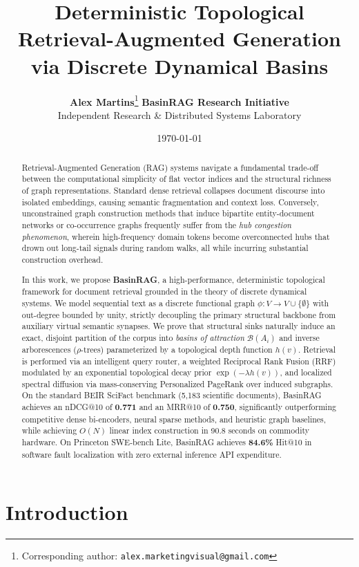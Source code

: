 \documentclass[10pt,twocolumn]{article}
\title{\textbf{Deterministic Topological Retrieval-Augmented Generation via Discrete Dynamical Basins}}
\author{
    \textbf{Alex Martins}\thanks{Corresponding author: \texttt{alex.marketingvisual@gmail.com}} \quad \textbf{BasinRAG Research Initiative} \\
    \small Independent Research \& Distributed Systems Laboratory
}
\date{\today}
\theoremstyle{definition}
\begin{document}
\maketitle

\begin{abstract}
Retrieval-Augmented Generation (RAG) systems navigate a fundamental trade-off between the computational simplicity of flat vector indices and the structural richness of graph representations. Standard dense retrieval collapses document discourse into isolated embeddings, causing semantic fragmentation and context loss. Conversely, unconstrained graph construction methods that induce bipartite entity-document networks or co-occurrence graphs frequently suffer from the \textit{hub congestion phenomenon}, wherein high-frequency domain tokens become overconnected hubs that drown out long-tail signals during random walks, all while incurring substantial construction overhead.

In this work, we propose \textbf{BasinRAG}, a high-performance, deterministic topological framework for document retrieval grounded in the theory of discrete dynamical systems. We model sequential text as a discrete functional graph $\phi: V \to V \cup \{\emptyset\}$ with out-degree bounded by unity, strictly decoupling the primary structural backbone from auxiliary virtual semantic synapses. We prove that structural sinks naturally induce an exact, disjoint partition of the corpus into \textit{basins of attraction} $\mathcal{B}(A_i)$ and inverse arborescences ($\rho$-trees) parameterized by a topological depth function $h(v)$. Retrieval is performed via an intelligent query router, a weighted Reciprocal Rank Fusion (RRF) modulated by an exponential topological decay prior $\exp(-\lambda h(v))$, and localized spectral diffusion via mass-conserving Personalized PageRank over induced subgraphs. On the standard BEIR SciFact benchmark (5,183 scientific documents), BasinRAG achieves an nDCG@10 of \textbf{0.771} and an MRR@10 of \textbf{0.750}, significantly outperforming competitive dense bi-encoders, neural sparse methods, and heuristic graph baselines, while achieving $O(N)$ linear index construction in 90.8 seconds on commodity hardware. On Princeton SWE-bench Lite, BasinRAG achieves \textbf{84.6\%} Hit@10 in software fault localization with zero external inference API expenditure.
\end{abstract}

\section{Introduction}
\end{document}
